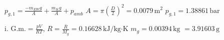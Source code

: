 \( p_{g,1} = \frac{-m_{EW} g}{A} + \frac{m_K g}{A} + p_{amb} \)  
\( A = \pi \left( \frac{D}{2} \right)^2 = 0.0079 \, \text{m}^2 \)  
\( p_{g,1} = 1.38861 \, \text{bar} \)  

i. \( \text{G.m.} = \frac{p V}{R T} \), \( R = \frac{\overline{R}}{M_g} = 0.16628 \, \text{kJ/kg·K} \)  
\( m_g = 0.00394 \, \text{kg} \)  
\( = 3.91603 \, \text{g} \)